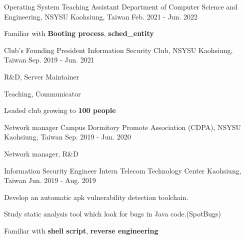 
\begin{cventries}
  \cventry
  {Operating System Teaching Assistant} %
  {Department of Computer Science and Engineering, NSYSU} %
  {Kaohsiung, Taiwan} %
  {Feb. 2021 - Jun. 2022} %
  {
	  \begin{cvitems}
		  \item {Familiar with \textbf{Booting process}, \textbf{sched\_entity}}
	  \end{cvitems}
  }

  \cventry
  {Club's Founding President} %
  {Information Security Club, NSYSU} %
  {Kaohsiung, Taiwan} %
  {Sep. 2019 - Jun. 2021} %
  {
    \begin{cvitems} %
      \item {R\&D, Server Maintainer}
      \item {Teaching, Communicator}
	  \item {Leaded club growing to \textbf{100 people}}
    \end{cvitems}
  }

  \cventry
  {Network manager} %
  {Campus Dormitory Promote Association (CDPA), NSYSU} %
  {Kaohsiung, Taiwan} %
  {Sep. 2019 - Jun. 2020} %
  {
    \begin{cvitems} %
      \item {Network manager, R\&D}
    \end{cvitems}
  }

  \cventry
  {Information Security Engineer Intern} %
  {Telecom Technology Center} %
  {Kaohsiung, Taiwan} %
  {Jun. 2019 - Aug. 2019} %
  {
    \begin{cvitems} %
      \item {Develop an automatic apk vulnerability detection toolchain.}
      \item {Study static analysis tool which look for bugs in Java code.(SpotBugs)}
	  \item {Familiar with \textbf{shell script}, \textbf{reverse engineering}}
    \end{cvitems}
  }


\end{cventries}
